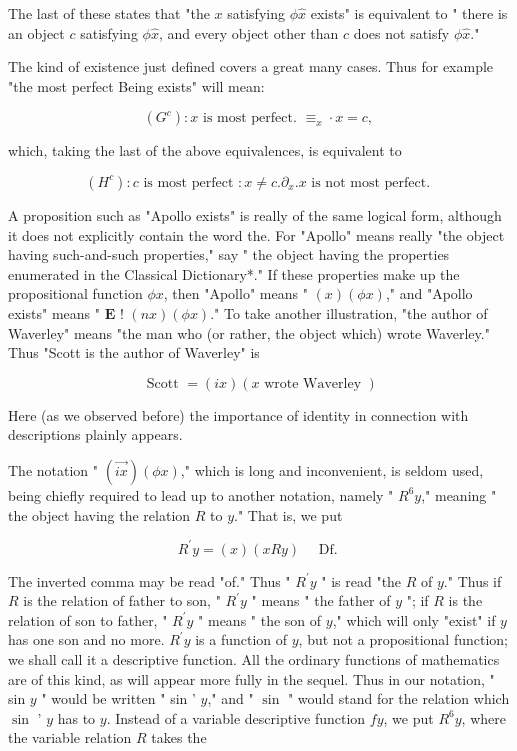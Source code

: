 \documentclass[10pt]{article}
\begin{document}
The last of these states that "the $x$ satisfying $\phi \hat{x}$ exists" is equivalent to " there is an object $c$ satisfying $\phi \hat{x}$, and every object other than $c$ does not satisfy $\phi \hat{x}$."

The kind of existence just defined covers a great many cases. Thus for example "the most perfect Being exists" will mean:

$$
\left(G^{c}\right): x \text { is most perfect. } \equiv_{x} \cdot x=c \text {, }
$$

which, taking the last of the above equivalences, is equivalent to

$$
\left(H^{c}\right): c \text { is most perfect }: x \neq c . \partial_{x} . x \text { is not most perfect. }
$$

A proposition such as "Apollo exists" is really of the same logical form, although it does not explicitly contain the word the. For "Apollo" means really "the object having such-and-such properties," say " the object having the properties enumerated in the Classical Dictionary*." If these properties make up the propositional function $\phi x$, then "Apollo" means " $(x)(\phi x)$," and "Apollo exists" means " $\mathbf{E}$ ! $(n x)(\phi x)$." To take another illustration, "the author of Waverley" means "the man who (or rather, the object which) wrote Waverley." Thus "Scott is the author of Waverley" is

$$
\text { Scott }=(i x)(x \text { wrote Waverley })
$$

Here (as we observed before) the importance of identity in connection with descriptions plainly appears.

The notation " $(\overrightarrow{i x})(\phi x)$," which is long and inconvenient, is seldom used, being chiefly required to lead up to another notation, namely " $R^{6} y$," meaning " the object having the relation $R$ to $y$." That is, we put

$$
R^{\prime} y=(x)(x R y) \quad \text { Df. }
$$

The inverted comma may be read "of." Thus " $R^{\prime} y$ " is read "the $R$ of $y$." Thus if $R$ is the relation of father to son, " $R^{\prime} y$ " means " the father of $y$ "; if $R$ is the relation of son to father, " $R^{\prime} y$ " means " the son of $y$," which will only "exist" if $y$ has one son and no more. $R^{\prime} y$ is a function of $y$, but not a propositional function; we shall call it a descriptive function. All the ordinary functions of mathematics are of this kind, as will appear more fully in the sequel. Thus in our notation, " sin $y$ " would be written " sin ' $y$," and " $\sin$ " would stand for the relation which $\sin$ ' $y$ has to $y$. Instead of a variable descriptive function $f y$, we put $R^{6} y$, where the variable relation $R$ takes the
\end{document}
